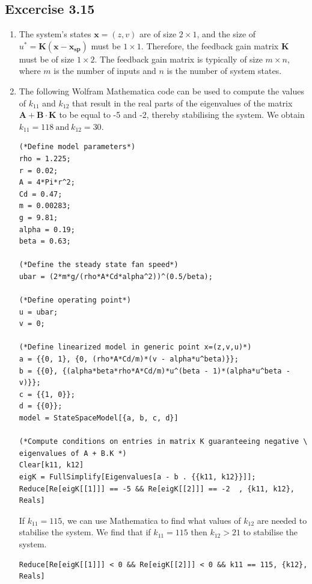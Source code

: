 \documentclass[10pt,twoside,openright]{article}
\begin{document}
\subsection*{Excercise 3.15}
\begin{enumerate}
	\setlength\itemsep{0em}
		\item The system's states $\bm{x} = (z, v)$ are of size $2\times1$, and the size of $u^* = \bm{K} \left(\bm{x} - \bm{x_{\text{sp}}} \right)$ must be $1\times1$. Therefore, the feedback gain matrix $\bm{K}$ must be of size $1\times2$.  The feedback gain matrix is typically of size $m \times n$, where $m$ is the number of inputs and $n$ is the number of system states.  
		\item The following Wolfram Mathematica code can be used to compute the values of $k_{11}$ and $k_{12}$ that result in the real parts of the eigenvalues of the matrix $\bm{A} + \bm{B} \cdot \bm{K}$ to be equal to -5 and -2, thereby stabilising the system. We obtain $k_{11} = 118~\text{and}~k_{12} = 30$.
		
\begin{lstlisting}[style=mathematica]
(*Define model parameters*)
rho = 1.225;
r = 0.02;
A = 4*Pi*r^2;
Cd = 0.47;
m = 0.00283;
g = 9.81;
alpha = 0.19; 
beta = 0.63; 

(*Define the steady state fan speed*)
ubar = (2*m*g/(rho*A*Cd*alpha^2))^(0.5/beta);

(*Define operating point*)
u = ubar;
v = 0;

(*Define linearized model in generic point x=(z,v,u)*)
a = {{0, 1}, {0, (rho*A*Cd/m)*(v - alpha*u^beta)}};
b = {{0}, {(alpha*beta*rho*A*Cd/m)*u^(beta - 1)*(alpha*u^beta - v)}};
c = {{1, 0}};
d = {{0}};
model = StateSpaceModel[{a, b, c, d}]

(*Compute conditions on entries in matrix K guaranteeing negative \
eigenvalues of A + B.K *)
Clear[k11, k12]
eigK = FullSimplify[Eigenvalues[a - b . {{k11, k12}}]];
Reduce[Re[eigK[[1]]] == -5 && Re[eigK[[2]]] == -2  , {k11, k12}, Reals]
\end{lstlisting}
		
		If $k_{11} = 115$, we can use Mathematica to find what values of $k_{12}$ are needed to stabilise the system. We find that if $k_{11} = 115$ then $k_{12} > 21$ to stabilise the system.
		
\begin{lstlisting}[style=mathematica]
Reduce[Re[eigK[[1]]] < 0 && Re[eigK[[2]]] < 0 && k11 == 115, {k12}, Reals]	
\end{lstlisting}


\end{enumerate}
\end{document}
